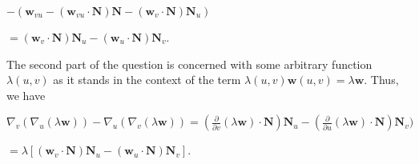 \documentclass[12pt, a4paper]{article}
\begin{document}
\begin{flushleft}
        \centerline{$-(\mathbf{w}_{vu}-(\mathbf{w}_{vu}\cdot\mathbf{N})\mathbf{N}-(\mathbf{w}_v\cdot\mathbf{N})\mathbf{N}_u)$}
        
\vspace{2mm}

        \centerline{$=(\mathbf{w}_v\cdot\mathbf{N})\mathbf{N}_u-(\mathbf{w}_u\cdot\mathbf{N})\mathbf{N}_v$.}
        
\vspace{4mm}

    The second part of the question is concerned with some arbitrary function $\lambda(u,v)$ as it stands in the context of the term $\lambda(u,v)\mathbf{w}(u,v)=\lambda\mathbf{w}$. Thus, we have\par
    
\vspace{4mm}

        \centerline{$\nabla_v(\nabla_u(\lambda\mathbf{w}))-\nabla_u(\nabla_v(\lambda\mathbf{w}))=(\frac{\partial}{\partial v}(\lambda\mathbf{w})\cdot\mathbf{N})\mathbf{N}_u-(\frac{\partial}{\partial u}(\lambda\mathbf{w})\cdot\mathbf{N})\mathbf{N}_v)$}
        
\vspace{2mm}

        \centerline{$=\lambda[(\mathbf{w}_v\cdot\mathbf{N})\mathbf{N}_u-(\mathbf{w}_u\cdot\mathbf{N})\mathbf{N}_v]$.}
    
\end{flushleft}
\end{document}
